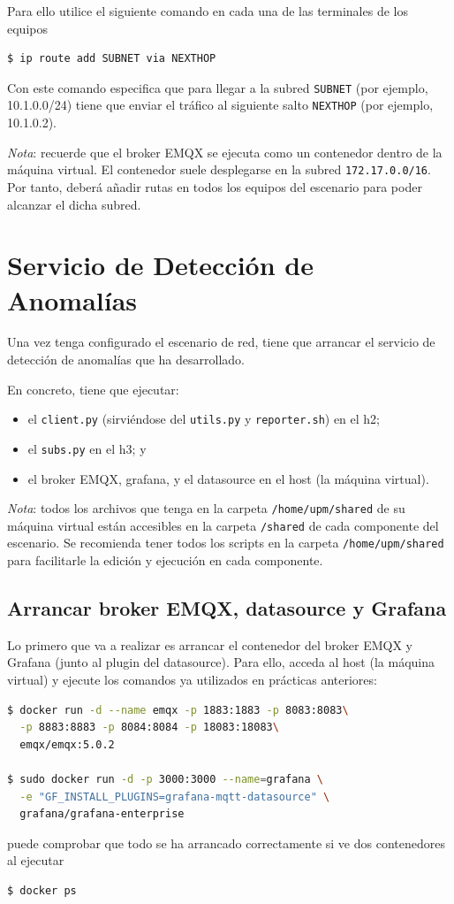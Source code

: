\documentclass{upmassignment}
\begin{document}
Para ello utilice el siguiente comando
en cada una de las terminales de los equipos
\begin{lstlisting}[language=bash]
$ ip route add SUBNET via NEXTHOP
\end{lstlisting}
Con este comando especifica que para
llegar a la subred \texttt{SUBNET}
(por ejemplo, 10.1.0.0/24)
tiene que enviar el tráfico al
siguiente salto \texttt{NEXTHOP}
(por ejemplo, 10.1.0.2).


\emph{Nota}: recuerde que el broker
EMQX se ejecuta como un contenedor
dentro de la máquina virtual.
El contenedor suele desplegarse en la
subred \texttt{172.17.0.0/16}.
Por tanto, deberá añadir rutas en todos
los equipos del escenario para poder
alcanzar el dicha subred.







\section*{Servicio de Detección de
Anomalías}
Una vez tenga configurado el escenario
de red, tiene que arrancar el servicio
de detección de anomalías que ha
desarrollado.

En concreto, tiene que ejecutar:
\begin{itemize}
    \item el \texttt{client.py}
        (sirviéndose del
        \texttt{utils.py} y
        \texttt{reporter.sh})
        en
        el h2;
    \item el \texttt{subs.py}
        en el h3; y
    \item el broker EMQX, grafana,
        y el datasource en el
        host (la máquina virtual).
\end{itemize}

\emph{Nota}: todos los archivos que
tenga en la carpeta
\texttt{/home/upm/shared}
de su máquina virtual están
accesibles en la carpeta
\texttt{/shared} de cada componente
del escenario.
Se recomienda tener todos los scripts
en la carpeta
\texttt{/home/upm/shared} para
facilitarle la edición y ejecución
en cada componente.


\subsection*{Arrancar broker EMQX, datasource
y Grafana}
Lo primero que va a realizar es
arrancar el contenedor del broker EMQX
y Grafana (junto al plugin del datasource).
Para ello, acceda al host (la máquina
virtual) y ejecute los comandos
ya utilizados en prácticas anteriores:
\begin{lstlisting}[language=bash]
$ docker run -d --name emqx -p 1883:1883 -p 8083:8083\
  -p 8883:8883 -p 8084:8084 -p 18083:18083\
  emqx/emqx:5.0.2

$ sudo docker run -d -p 3000:3000 --name=grafana \
  -e "GF_INSTALL_PLUGINS=grafana-mqtt-datasource" \
  grafana/grafana-enterprise
\end{lstlisting}
puede comprobar que todo se ha arrancado
correctamente si ve dos contenedores
al ejecutar
\begin{lstlisting}[language=bash]
$ docker ps
\end{lstlisting}
\end{document}
